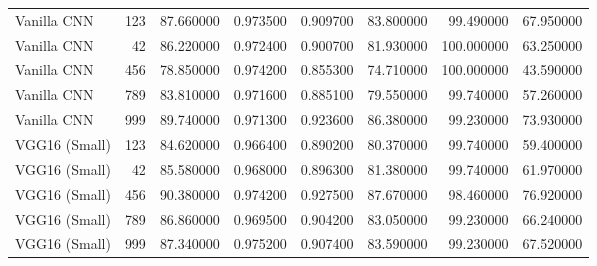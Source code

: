 \begin{tabular}{lrrrrrrr}
Vanilla CNN & 123 & 87.660000 & 0.973500 & 0.909700 & 83.800000 & 99.490000 & 67.950000 \\
Vanilla CNN & 42 & 86.220000 & 0.972400 & 0.900700 & 81.930000 & 100.000000 & 63.250000 \\
Vanilla CNN & 456 & 78.850000 & 0.974200 & 0.855300 & 74.710000 & 100.000000 & 43.590000 \\
Vanilla CNN & 789 & 83.810000 & 0.971600 & 0.885100 & 79.550000 & 99.740000 & 57.260000 \\
Vanilla CNN & 999 & 89.740000 & 0.971300 & 0.923600 & 86.380000 & 99.230000 & 73.930000 \\
VGG16 (Small) & 123 & 84.620000 & 0.966400 & 0.890200 & 80.370000 & 99.740000 & 59.400000 \\
VGG16 (Small) & 42 & 85.580000 & 0.968000 & 0.896300 & 81.380000 & 99.740000 & 61.970000 \\
VGG16 (Small) & 456 & 90.380000 & 0.974200 & 0.927500 & 87.670000 & 98.460000 & 76.920000 \\
VGG16 (Small) & 789 & 86.860000 & 0.969500 & 0.904200 & 83.050000 & 99.230000 & 66.240000 \\
VGG16 (Small) & 999 & 87.340000 & 0.975200 & 0.907400 & 83.590000 & 99.230000 & 67.520000 \\
\bottomrule
\end{tabular}
